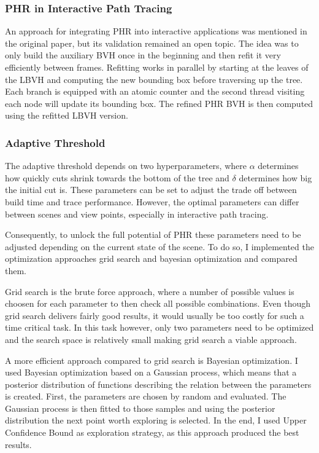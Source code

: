\subsubsection{PHR in Interactive Path Tracing}
An approach for integrating PHR into interactive applications was mentioned in the original paper\cite{hendrich_parallel_2017}, but its validation remained an open topic. The idea was to only build the auxiliary BVH once in the beginning and then refit it very efficiently between frames. Refitting works in parallel by starting at the leaves of the LBVH and computing the new bounding box before traversing up the tree. Each branch is equipped with an atomic counter and the second thread visiting each node will update its bounding box. The refined PHR BVH is then computed using the refitted LBVH version. 

\subsubsection{Adaptive Threshold}
\label{adaptive threshold}
The adaptive threshold depends on two hyperparameters, where $\alpha$ determines how quickly cuts shrink towards the bottom of the tree and $\delta$ determines how big the initial cut is. These parameters can be set to adjust the trade off between build time and trace performance. However, the optimal parameters can differ between scenes and view points, especially in interactive path tracing. 



Consequently, to unlock the full potential of PHR these parameters need to be adjusted depending on the current state of the scene. To do so, I implemented the optimization approaches grid search and bayesian optimization and compared them.

Grid search is the brute force approach, where a number of possible values is choosen for each parameter to then check all possible combinations. Even though grid search delivers fairly good results, it would usually be too costly for such a time critical task. In this task however, only two parameters need to be optimized and the search space is relatively small making grid search a viable approach. 

A more efficient approach compared to grid search is Bayesian optimization. I used Bayesian optimization based on a Gaussian process, which means that a posterior distribution of functions describing the relation between the parameters is created. First, the parameters are chosen by random and evaluated. The Gaussian process is then fitted to those samples and using the posterior distribution the next point worth exploring is selected. In the end, I used Upper Confidence Bound as exploration strategy, as this approach produced the best results. 

